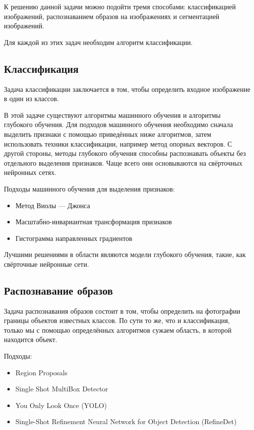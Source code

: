 \documentclass[14pt]{matmex-diploma}
\begin{document}
    К решению данной задачи можно подойти тремя способами: классификацией изображений, распознаванием образов на изображениях и сегментацией изображений.
    
    Для каждой из этих задач необходим алгоритм классификации.
    
    \subsection{Классификация}
    
        Задача классификации заключается в том, чтобы определить входное изображение в один из классов.
    
        В этой задаче существуют алгоритмы машинного обучения и алгоритмы глубокого обучения. Для подходов машинного обучения необходимо сначала выделить признаки с помощью приведённых ниже алгоритмов, затем использовать техники классификации, например метод опорных векторов. С другой стороны, методы глубокого обучения способны распознавать объекты без отдельного выделения признаков. Чаще всего они основываются на свёрточных нейронных сетях.
        
        Подходы машинного обучения для выделения признаков:
        \begin{itemize}
            \item Метод Виолы — Джонса
            \item Масштабно-инвариантная трансформация признаков
            \item Гистограмма направленных градиентов
        \end{itemize}
        
        Лучшими решениями в области являются модели глубокого обучения, такие, как свёрточные нейронные сети.
        
      
    \subsection{Распознавание образов}
    
        Задача распознавания образов состоит в том, чтобы определить на фотографии границы объектов известных классов. По сути то же, что и классификация, только мы с помощью определённых алгоритмов сужаем область, в которой находится объект.
    
        Подходы:
        \begin{itemize}
            \item Region Proposals
            \item Single Shot MultiBox Detector
            \item You Only Look Once (YOLO)
            \item Single-Shot Refinement Neural Network for Object Detection (RefineDet)
        \end{itemize}
        
\end{document}
